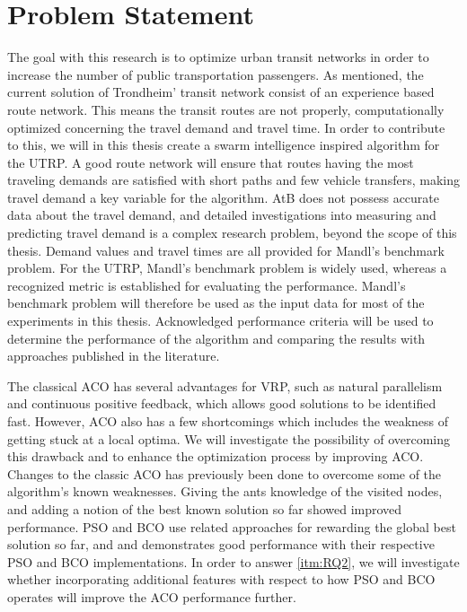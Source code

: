 \section{Problem Statement}
\label{subsec:problemStatement}

The goal with this research is to optimize urban transit networks in order to increase the number of public transportation passengers. As mentioned, the current solution of Trondheim' transit network consist of an experience based route network. This means the transit routes are not properly, computationally optimized concerning the travel demand and travel time. In order to contribute to this, we will in this thesis create a swarm intelligence inspired algorithm for the UTRP. A good route network will ensure that routes having the most traveling demands are satisfied with short paths and few vehicle transfers, making travel demand a key variable for the algorithm. AtB\citep{website:atb} does not possess accurate data about the travel demand, and detailed investigations into measuring and predicting travel demand is a complex research problem, beyond the scope of this thesis. Demand values and travel times are all provided for Mandl's benchmark problem\citep{mandl79}. For the UTRP, Mandl's benchmark problem is widely used, whereas a recognized metric is established for evaluating the performance. Mandl's benchmark problem will therefore be used as the input data for most of the experiments in this thesis. Acknowledged performance criteria will be used to determine the performance of the algorithm and comparing the results with approaches published in the literature\citep{nikolic14,kechagiopoulos14,mandl79,kidwai98, fan10, chakroborty02, zhang10, chew12}.

The classical ACO has several advantages for VRP, such as natural parallelism and continuous positive feedback, which allows good solutions to be identified fast. However, ACO also has a few shortcomings which includes the weakness of getting stuck at a local optima. We will investigate the possibility of overcoming this drawback and to enhance the optimization process by improving ACO. Changes to the classic ACO has previously been done to overcome some of the algorithm's known weaknesses. Giving the ants knowledge of the visited nodes\citep{sedighpour14,salehinejad10,poorzahedy11}, and adding a notion of the best known solution so far\citep{tripathi09,sedighpour14} showed improved performance. PSO and BCO use related approaches for rewarding the global best solution so far, and \citet{kechagiopoulos14} and \citet{nikolic14} demonstrates good performance with their respective PSO and BCO implementations. In order to answer \vref{itm:RQ2}, we will investigate whether incorporating additional features with respect to how PSO and BCO operates will improve the ACO performance further.

